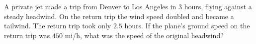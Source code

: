 A private jet made a trip from Denver to Los Angeles in $3$ hours, flying against a steady headwind. On the return trip the wind speed doubled and became a tailwind. The return trip took only $2.5$ hours. If the plane's ground speed on the return trip was $450$ mi/h, what was the speed of the original headwind?
